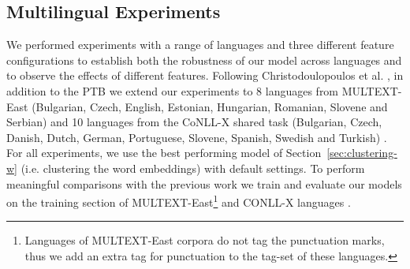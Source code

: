 \subsection{Multilingual Experiments}
\label{sec:multilang}
\noindent We performed experiments with a range of languages and three
different feature configurations to establish both the robustness of
our model across languages and to observe the effects of different
features.  Following Christodoulopoulos et
al. , in
addition to the PTB we extend our experiments to 8 languages from
MULTEXT-East (Bulgarian, Czech, English, Estonian, Hungarian,
Romanian, Slovene and Serbian) \cite{citeulike:5820223} and 10
languages from the CoNLL-X shared task (Bulgarian, Czech, Danish,
Dutch, German, Portuguese, Slovene, Spanish, Swedish and Turkish)
\cite{Buchholz:2006:CST:1596276.1596305}.  For all experiments, we use
the best performing model of Section~\ref{sec:clustering-w} (i.e.
clustering the word embeddings) with default settings.  To perform
meaningful comparisons with the previous work we train and evaluate
our models on the training section of MULTEXT-East\footnote{Languages
  of MULTEXT-East corpora do not tag the punctuation marks, thus we
  add an extra tag for punctuation to the tag-set of these languages.}
and CONLL-X languages \cite{Lee:2010:STU:1870658.1870741}.




